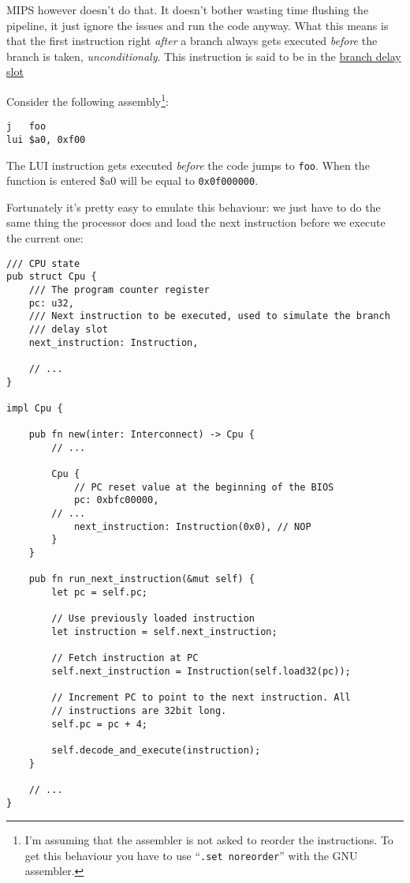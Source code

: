 \documentclass[a4paper]{article}
\newcommand{\code}[1] {\texttt{#1}}
\begin{document}
MIPS however doesn't do that. It doesn't bother wasting time flushing
the pipeline, it just ignore the issues and run the code anyway. What
this means is that the first instruction right \emph{after} a branch
always gets executed \emph{before} the branch is taken,
\emph{unconditionaly}. This instruction is said to be in the
\href{https://en.wikipedia.org/wiki/Delay_slot}{branch delay slot}

Consider the following assembly\footnote{I'm assuming that
  the assembler is not asked to reorder the instructions. To get this
  behaviour you have to use ``\code{.set noreorder}'' with the GNU
  assembler.}:

\begin{lstlisting}[language=assembly]
j   foo
lui $a0, 0xf00
\end{lstlisting}

The LUI instruction gets executed \emph{before} the code jumps to
\code{foo}. When the function is entered \$a0 will be equal to
\code{0x0f000000}.

Fortunately it's pretty easy to emulate this behaviour: we just have
to do the same thing the processor does and load the next instruction
before we execute the current one:

\begin{lstlisting}
/// CPU state
pub struct Cpu {
    /// The program counter register
    pc: u32,
    /// Next instruction to be executed, used to simulate the branch
    /// delay slot
    next_instruction: Instruction,

    // ...
}

impl Cpu {

    pub fn new(inter: Interconnect) -> Cpu {
        // ...

        Cpu {
            // PC reset value at the beginning of the BIOS
            pc: 0xbfc00000,
	    // ...
            next_instruction: Instruction(0x0), // NOP
        }
    }

    pub fn run_next_instruction(&mut self) {
        let pc = self.pc;

        // Use previously loaded instruction
        let instruction = self.next_instruction;

        // Fetch instruction at PC
        self.next_instruction = Instruction(self.load32(pc));

        // Increment PC to point to the next instruction. All
        // instructions are 32bit long.
        self.pc = pc + 4;

        self.decode_and_execute(instruction);
    }

    // ...
}
\end{lstlisting}
\end{document}
